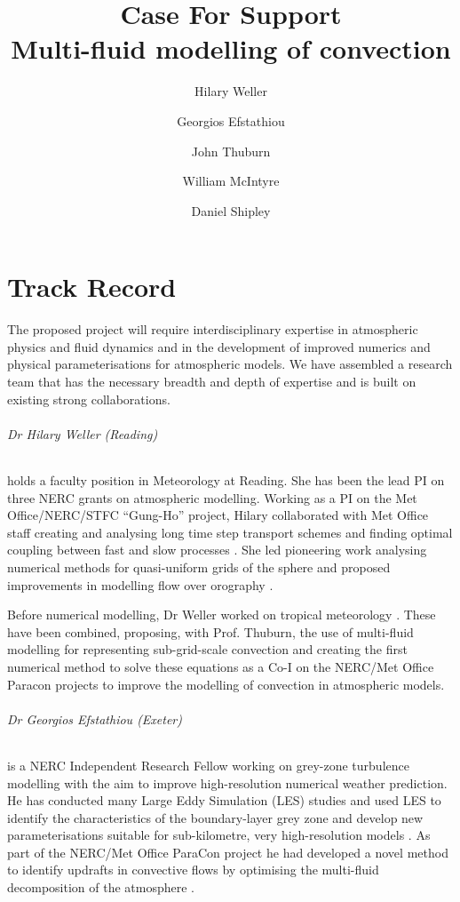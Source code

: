 \documentclass[11pt,a4paper]{article}
\begin{document}
\title{Case For Support \\ \Large
Multi-fluid modelling of convection
}
\author{Hilary Weller \and Georgios Efstathiou \and John Thuburn \and William McIntyre \and Daniel Shipley}
\date{}
\maketitle

\part{Track Record}

The proposed project will require interdisciplinary expertise in atmospheric physics and fluid dynamics
and in the development of improved numerics and physical parameterisations for atmospheric models.
We have assembled a research team that has the necessary breadth and depth of expertise and is built on
existing strong collaborations.


\paragraph*{Dr Hilary Weller (Reading)} holds a faculty position in Meteorology at Reading. She has been the lead PI on three NERC grants on atmospheric modelling. Working as a PI on the Met Office/NERC/STFC ``Gung-Ho'' project, Hilary collaborated with Met Office staff creating and analysing long time step transport schemes \cite[]{CWPS17,SWMD17} and finding optimal coupling between fast and slow processes \cite[][]{WLW13}. She led pioneering work analysing numerical methods for quasi-uniform grids of the sphere \cite[e.g.][]{Wel12,WTC12} and proposed improvements in modelling flow over orography \cite[]{WS14}. 

Before numerical modelling, Dr Weller worked on tropical meteorology \cite[e.g.][]{LGWS09}. These have been combined, proposing, with Prof. Thuburn, the use of multi-fluid modelling for representing sub-grid-scale convection \cite[]{TWV+18} and creating the first numerical method to solve these equations \cite[]{WM19} as a Co-I on the NERC/Met Office Paracon projects to improve the modelling of convection in atmospheric models.

\paragraph*{Dr Georgios Efstathiou (Exeter)} is a NERC Independent Research Fellow working on grey-zone turbulence modelling with the aim to improve high-resolution numerical weather prediction. He has conducted many Large Eddy Simulation (LES) studies and used LES to identify the characteristics of the boundary-layer grey zone \citep[e.g.][]{efstathiou2015} and develop new parameterisations suitable for sub-kilometre, very high-resolution models \citep{efstathiou2016,efstathiou2018,efstathiou2019a}. As part of the NERC/Met Office ParaCon project he had developed a novel method to identify updrafts in convective flows by optimising the multi-fluid decomposition of the atmosphere \citep{ETB20}.
\end{document}
